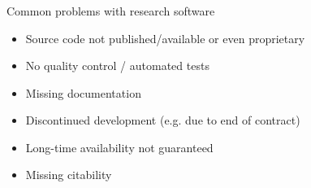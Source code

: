 \documentclass{beamer}
\begin{document}
\begin{frame}
  \frametitle{}
  \begin{block}{}
    \begin{center}
      Common problems with research software\\      
      \begin{itemize}
      \item Source code not published/available or even proprietary
      \item No quality control / automated tests
      \item Missing documentation
      \item Discontinued development (e.g. due to end of contract)
      \item Long-time availability not guaranteed        
      \item Missing citability
      \end{itemize}      
    \end{center}
  \end{block}
\end{frame}
\end{document}
